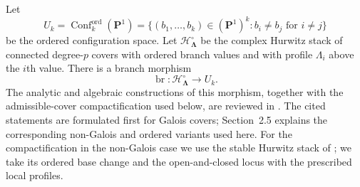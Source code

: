 \documentclass[11pt]{amsart}
\theoremstyle{plain}
\theoremstyle{definition}
\numberwithin{equation}{section}
\begin{document}
Let
\[
 U_k=\operatorname{Conf}^{\mathrm{ord}}_k(\mathbf P^1)
 =\{(b_1,\ldots,b_k)\in(\mathbf P^1)^k:b_i\neq b_j\text{ for }i\neq j\}
\]
be the ordered configuration space.  Let
$\mathcal H^\circ_{\boldsymbol\Lambda}$ be the complex Hurwitz stack of
connected degree-$p$ covers with ordered branch values and with profile
$\Lambda_i$ above the $i$th value.  There is a branch morphism
\[
 \operatorname{br}:\mathcal H^\circ_{\boldsymbol\Lambda}\longrightarrow U_k.
\]
The analytic and algebraic constructions of this morphism, together with
the admissible-cover compactification used below, are reviewed in
\cite[Section~2.5, Proposition~3.2, Theorem~4.11,
Remark~4.15(i), and Section~5]{RomagnyWewers}.  The cited statements are
formulated first for Galois covers; Section~2.5 explains the corresponding
non-Galois and ordered variants used here.
For the compactification in the non-Galois case we use the stable Hurwitz
stack of \cite[Sections~6.3 and~6.6, especially Theorem~6.3.1 and
Proposition~6.6.12]{BertinRomagny}; we take its ordered base change and the
open-and-closed locus with the prescribed local profiles.
\end{document}
